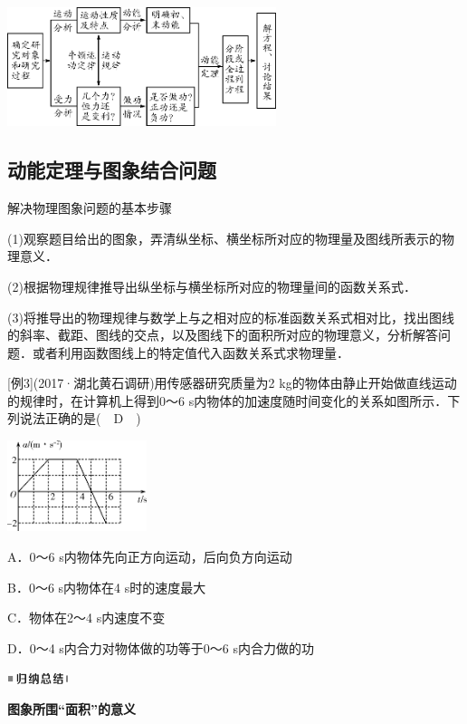 \begin{center}\includegraphics[width=3.09444in,height=1.36806in]{media/image224.png}\end{center}

\subsection{动能定理与图象结合问题}

解决物理图象问题的基本步骤

(1)观察题目给出的图象，弄清纵坐标、横坐标所对应的物理量及图线所表示的物理意义．

(2)根据物理规律推导出纵坐标与横坐标所对应的物理量间的函数关系式．

(3)将推导出的物理规律与数学上与之相对应的标准函数关系式相对比，找出图线的斜率、截距、图线的交点，以及图线下的面积所对应的物理意义，分析解答问题．或者利用函数图线上的特定值代入函数关系式求物理量．

{[}例3{]}(2017·湖北黄石调研)用传感器研究质量为2
kg的物体由静止开始做直线运动的规律时，在计算机上得到0～6
s内物体的加速度随时间变化的关系如图所示．下列说法正确的是(　D　)

\begin{center}\includegraphics[width=1.60347in,height=1.04722in]{media/image225.png}\end{center}

A．0～6 s内物体先向正方向运动，后向负方向运动

B．0～6 s内物体在4 s时的速度最大

C．物体在2～4 s内速度不变

D．0～4 s内合力对物体做的功等于0～6 s内合力做的功

\begin{center}\includegraphics[width=0.70764in,height=0.12292in]{media/image13.png}

\textbf{图象所围``面积''的意义}
\end{center}


